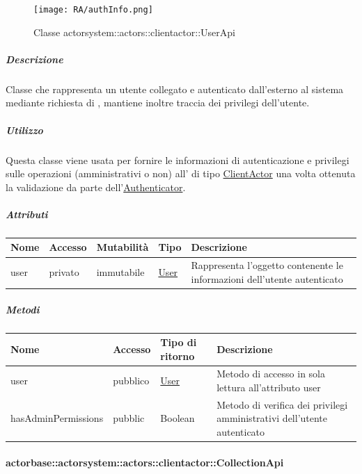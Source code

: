 \documentclass{scalatekids-article}
\begin{document}
\begin{figure}[H]
  \begin{center}
    \texttt{[image: RA/authInfo.png]}
    \caption{Classe actorsystem::actors::clientactor::UserApi}
  \end{center}
\end{figure}

\subparagraph{Descrizione}

Classe che rappresenta un utente collegato e autenticato dall'esterno al sistema
mediante richiesta di , mantiene inoltre traccia dei privilegi
dell'utente.

\subparagraph{Utilizzo}

Questa classe viene usata per fornire le informazioni di autenticazione e
privilegi sulle operazioni (amministrativi o non) all' di tipo
\hyperref[sec:actorbase::actorsystem::actors::clientactor::ClientActor]{ClientActor}
una volta ottenuta la validazione da parte
dell'\hyperref[sec:actorbase::actorsystem::actors::clientactor::Authenticator]{Authenticator}.

\subparagraph{Attributi}
\begin{tabular}{| p{1.5cm} | p{1.5cm} | p{2cm} | p{3cm} | p{8.5cm} |}
  \hline
  Nome & Accesso & Mutabilità & Tipo & Descrizione\\
  \hline
  user & privato & immutabile & \hyperref[sec:actorbase::actorsystem::actors::clientactor::User]{User} & Rappresenta l'oggetto contenente le informazioni dell'utente autenticato\\
  \hline
\end{tabular}

\subparagraph{Metodi}

\begin{tabular}{| p{1.5cm} | p{1.5cm} | p{2.5cm} | p{9.5cm} |}
  \hline
  Nome & Accesso & Tipo di ritorno & Descrizione\\
  \hline
  user & pubblico & \hyperref[sec:actorbase::actorsystem::actors::clientactor::User]{User} & Metodo di accesso in sola lettura all'attributo user\\
  \hline
  hasAdminPermissions & pubblic & Boolean & Metodo di verifica dei privilegi amministrativi dell'utente autenticato\\
  \hline
\end{tabular}

\paragraph{actorbase::actorsystem::actors::clientactor::CollectionApi}
\label{sec:actorbase::actorsystem::actors::clientactor::CollectionApi}
\end{document}
